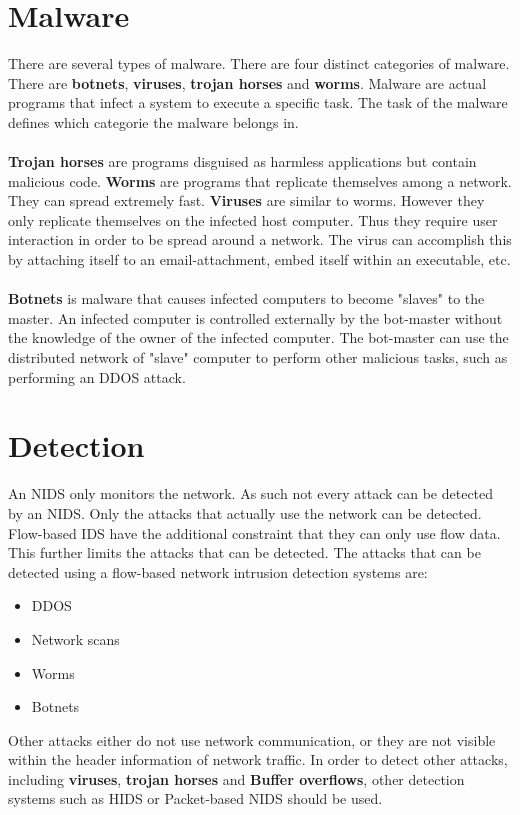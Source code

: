 \section{Malware}
There are several types of malware. There are four distinct categories of malware. There are \textbf{botnets}, \textbf{viruses}, \textbf{trojan horses} and \textbf{worms}. Malware are actual programs that infect a system to execute a specific task. The task of the malware defines which categorie the malware belongs in.\\
\\
\textbf{Trojan horses} are programs disguised as harmless applications but contain malicious code. \textbf{Worms} are programs that replicate themselves among a network.  They can spread extremely fast. \textbf{Viruses} are similar to worms. However they only replicate themselves on the infected host computer. Thus they require user interaction in order to be spread around a network. The virus can accomplish this by attaching itself to an email-attachment, embed itself within an executable, etc. \\
\\
\textbf{Botnets} is malware that causes infected computers to become "slaves" to the master. An infected computer is controlled externally by the bot-master without the knowledge of the owner of the infected computer. The bot-master can use the distributed network of "slave" computer to perform other malicious tasks, such as performing an DDOS attack. \cite{IPFlow}

\section{Detection}
An NIDS only monitors the network. As such not every attack can be detected by an NIDS. Only the attacks that actually use the network can be detected. Flow-based IDS have the additional constraint that they can only use flow data. This further limits the attacks that can be detected. The attacks that can be detected using a flow-based network intrusion detection systems are:
\begin{itemize}
\item DDOS
\item Network scans
\item Worms
\item Botnets
\end{itemize}
Other attacks either do not use network communication, or they are not visible within the header information of network traffic. In order to detect other attacks, including \textbf{viruses}, \textbf{trojan horses} and \textbf{Buffer overflows}, other detection systems such as HIDS or Packet-based NIDS should be used.

